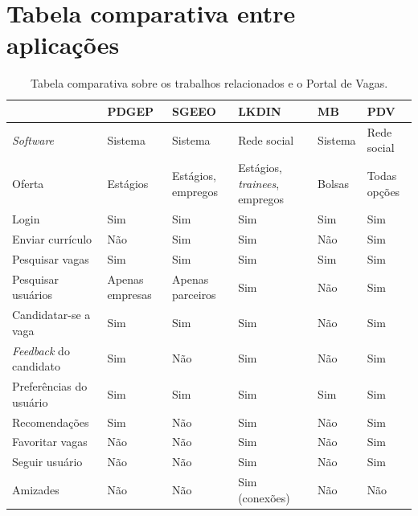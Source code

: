 \chapter{Tabela comparativa entre aplicações}
\label{appendTabela}
  \begin{landscape}  
    \begin{table}[h]
        \begin{center}
        \caption{Tabela comparativa sobre os trabalhos relacionados e o Portal de Vagas.}
        \begin{tabular}{llllll}
        \hline
                            & PDGEP           & SGEEO             & LKDIN         & MB      & PDV\\
        \hline
        \textit{Software}   & Sistema         & Sistema           & Rede social   & Sistema & Rede social \\
        Oferta              & Estágios        & Estágios, empregos &Estágios, \textit{trainees}, empregos & Bolsas & Todas opções \\
        Login               & Sim             & Sim               & Sim           & Sim     & Sim \\
        Enviar currículo    & Não             & Sim               & Sim           & Não     & Sim \\
        Pesquisar vagas     & Sim             & Sim               & Sim           & Sim     & Sim \\
        Pesquisar usuários  & Apenas empresas & Apenas parceiros  & Sim           & Não     & Sim \\
        Candidatar-se a vaga& Sim             & Sim               & Sim           & Não     & Sim \\
        \textit{Feedback} do candidato & Sim  & Não               & Sim           & Não     & Sim \\
        Preferências do usuário & Sim         & Sim               & Sim           & Sim     & Sim \\
        Recomendações       & Sim             & Não               & Sim           & Não     & Sim \\
        Favoritar vagas     & Não             & Não               & Sim           & Não     & Sim \\
        Seguir usuário      & Não             & Não               & Sim           & Não     & Sim \\
        Amizades            & Não             & Não               & Sim (conexões) & Não    & Não \\

\end{tabular}
\end{center}
\end{table}
\end{landscape}
